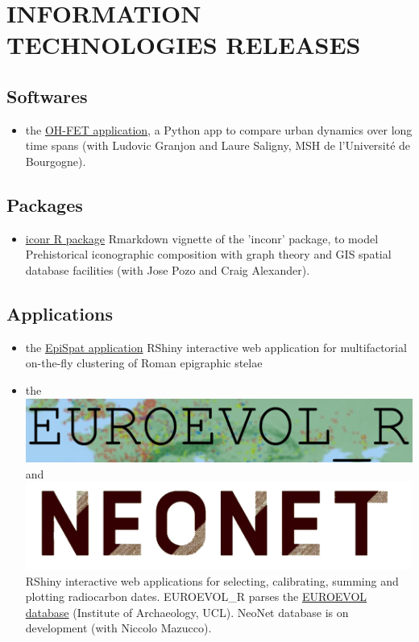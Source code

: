 \documentclass[11pt]{report} %
\begin{document}
\section*{INFORMATION TECHNOLOGIES RELEASES}

\subsection*{Softwares}

\begin{itemize}
  \item the \href{https://www.oxbowbooks.com/dbbc/caa2014-21st-century-archaeology.html/}{OH-FET application}, a \textsf{Python} app to compare urban dynamics over long time spans (with Ludovic Granjon and Laure Saligny, MSH de l'Université de Bourgogne).
\end{itemize}

\subsection*{Packages}

\begin{itemize}
\item \href{https://zoometh.github.io/iconr/vignettes/}{iconr \textsf{R} package} Rmarkdown vignette of the 'inconr' package, to model Prehistorical iconographic composition with graph theory and GIS spatial database facilities (with Jose Pozo and Craig Alexander).
\end{itemize}

\subsection*{Applications}

\begin{itemize}
\item the \href{https://epispat.shinyapps.io/analyses_mult_5/}{EpiSpat application} RShiny interactive web application for multifactorial on-the-fly clustering of Roman epigraphic stelae
\item the \href{https://neolithic.shinyapps.io/Euroevol\_R/}{\includegraphics[scale=0.20]{"euroevol_R"}} and \href{https://neolithic.shinyapps.io/neonet/}{\includegraphics[scale=0.04]{"neonet"}} RShiny interactive web applications for selecting, calibrating, summing and plotting radiocarbon dates. EUROEVOL\_R parses the \href{http://discovery.ucl.ac.uk/1469811/}{EUROEVOL database} (Institute of Archaeology, UCL). NeoNet database is on development (with Niccolo Mazucco).
\end{itemize}
\end{document}
